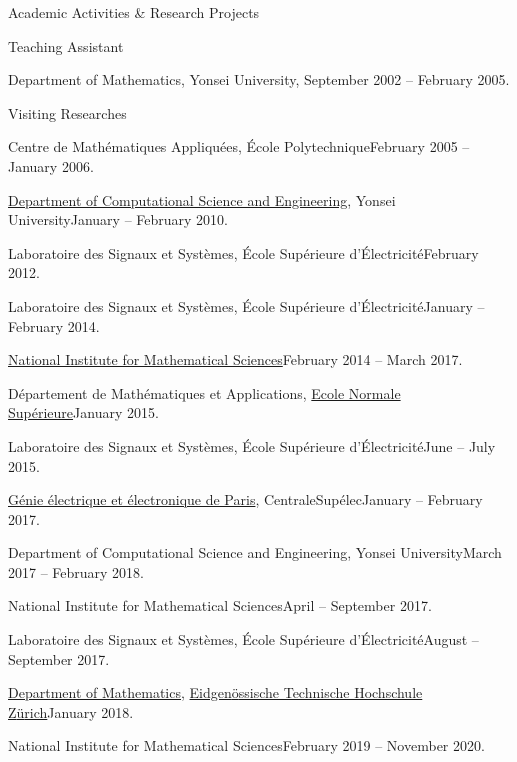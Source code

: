 \documentclass{resume} %
\begin{document}
\begin{rSection}{Academic Activities \& Research Projects}
\begin{rSubsection}{Teaching Assistant}{}{}{}
\item Department of Mathematics, Yonsei University, September 2002 -- February 2005.
\end{rSubsection}

\begin{rSubsection}{Visiting Researches}{}{}{}
\item Centre de Math\'ematiques Appliqu\'ees, \'Ecole Polytechnique\hfill February 2005 -- January 2006.
\item \href{http://http://web.yonsei.ac.kr/CSEgrad/}{Department of Computational Science and Engineering}, Yonsei University\hfill January -- February 2010.
\item Laboratoire des Signaux et Syst\`emes, \'Ecole Sup\'erieure d'\'Electricit\'e\hfill February 2012.
\item Laboratoire des Signaux et Syst\`emes, \'Ecole Sup\'erieure d'\'Electricit\'e\hfill January -- February 2014.
\item \href{http://nims.re.kr/}{National Institute for Mathematical Sciences}\hfill February 2014 -- March 2017.
\item D\'epartement de Math\'ematiques et Applications, \href{http://www.ens.fr/}{Ecole Normale Sup\'erieure}\hfill January 2015.
\item Laboratoire des Signaux et Syst\`emes, \'Ecole Sup\'erieure d'\'Electricit\'e\hfill June -- July 2015.
\item \href{http//geeps.CentraleSup{\'e}lec.fr}{G\'enie \'electrique et \'electronique de Paris}, CentraleSup{\'e}lec\hfill January -- February 2017.
\item Department of Computational Science and Engineering, Yonsei University\hfill March 2017 -- February 2018.
\item National Institute for Mathematical Sciences\hfill April -- September 2017.
\item Laboratoire des Signaux et Syst\`emes, \'Ecole Sup\'erieure d'\'Electricit\'e\hfill August -- September 2017.
\item \href{http://www.math.ethz.ch/}{Department of Mathematics}, \href{http://www.ethz.ch/}{Eidgen{\"o}ssische Technische Hochschule Z{\"u}rich}\hfill January 2018.
\item National Institute for Mathematical Sciences\hfill February 2019 -- November 2020.

\end{rSubsection}
\end{rSection}
\end{document}
